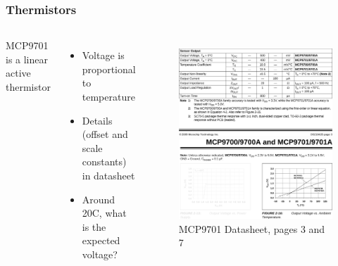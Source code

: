 \documentclass{beamer}
\begin{document}
\begin{frame}
\frametitle{Thermistors}
\begin{columns}[t]
  MCP9701 is a linear active thermistor
  \begin{itemize}
    \item Voltage is proportional to temperature
    \item Details (offset and scale constants) in datasheet
    \item Around 20C, what is the expected voltage?
  \end{itemize}
  \begin{figure}
    \centering
    \includegraphics[width = 0.9\columnwidth]{external/mcp9701-p3-outputtable} \\
    \includegraphics[width = 0.9\columnwidth]{external/mcp9701-p7-outputchart} \\
    MCP9701 Datasheet, pages 3 and 7
  \end{figure}
\end{columns}
\end{frame}
\end{document}
